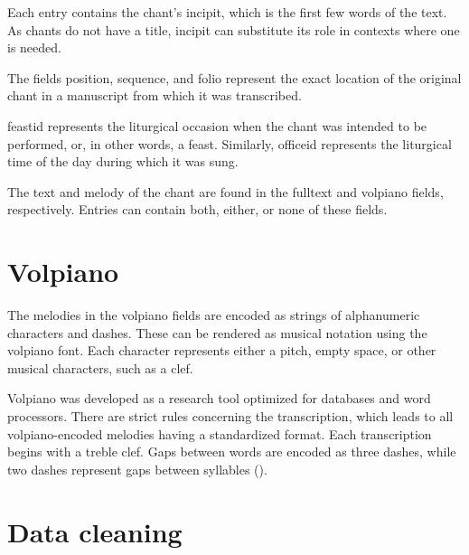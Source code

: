Each entry contains the chant's incipit, which is the first few words of the text. As chants do not have a title, incipit can substitute its role
in contexts where one is needed.

The fields position, sequence, and folio represent the exact location of the original chant in a manuscript from which it was transcribed.

feastid represents the liturgical occasion when the chant was intended to be performed, or, in other words, a feast. Similarly, officeid represents
the liturgical time of the day during which it was sung.

The text and melody of the chant are found in the fulltext and volpiano fields, respectively. Entries can contain both, either, or none of these fields.

\section{Volpiano}

The melodies in the volpiano fields are encoded as strings of alphanumeric characters and dashes. These can be rendered as musical notation using
the volpiano font. Each character represents either a pitch, empty space, or other musical characters, such as a clef.

Volpiano was developed as a research tool optimized for databases and word processors. There are strict rules concerning the transcription, which leads
to all volpiano-encoded melodies having a standardized format. Each transcription begins with a treble clef. Gaps between words are encoded as three
dashes, while two dashes represent gaps between syllables (\cite{volpiano}).

\section{Data cleaning}

